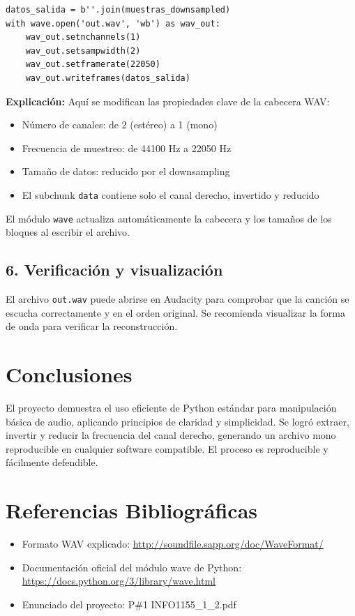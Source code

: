 \documentclass[12pt]{article}
\begin{document}
\begin{verbatim}
datos_salida = b''.join(muestras_downsampled)
with wave.open('out.wav', 'wb') as wav_out:
    wav_out.setnchannels(1)
    wav_out.setsampwidth(2)
    wav_out.setframerate(22050)
    wav_out.writeframes(datos_salida)
\end{verbatim}

\textbf{Explicación:} Aquí se modifican las propiedades clave de la cabecera WAV:
\begin{itemize}
    \item Número de canales: de 2 (estéreo) a 1 (mono)
    \item Frecuencia de muestreo: de 44100 Hz a 22050 Hz
    \item Tamaño de datos: reducido por el downsampling
    \item El subchunk \texttt{data} contiene solo el canal derecho, invertido y reducido
\end{itemize}
El módulo \texttt{wave} actualiza automáticamente la cabecera y los tamaños de los bloques al escribir el archivo.

\subsection*{6. Verificación y visualización}
El archivo \texttt{out.wav} puede abrirse en Audacity para comprobar que la canción se escucha correctamente y en el orden original. Se recomienda visualizar la forma de onda para verificar la reconstrucción.

\section{Conclusiones}
El proyecto demuestra el uso eficiente de Python estándar para manipulación básica de audio, aplicando principios de claridad y simplicidad. Se logró extraer, invertir y reducir la frecuencia del canal derecho, generando un archivo mono reproducible en cualquier software compatible. El proceso es reproducible y fácilmente defendible.

\section{Referencias Bibliográficas}
\begin{itemize}
    \item Formato WAV explicado: \url{http://soundfile.sapp.org/doc/WaveFormat/}
    \item Documentación oficial del módulo wave de Python: \url{https://docs.python.org/3/library/wave.html}
    \item Enunciado del proyecto: P\#1 INFO1155\_1\_2.pdf
\end{itemize}
\end{document}
